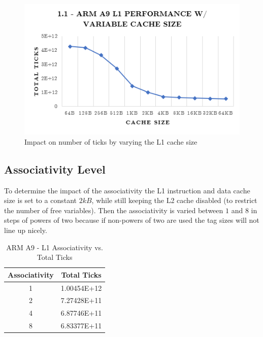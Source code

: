 \documentclass[a4paper, 10pt, conference]{ieeeconf}      %
\begin{document}
\begin{figure}[thpb]
\centering
\includegraphics[scale=.5]{ex1_1.png}
\caption{Impact on number of ticks by varying the L1 cache size}
\label{fig:ex1_1}
\end{figure}

\subsection{Associativity Level}

To determine the impact of the associativity the L1 instruction and data cache size is set to a constant $2kB$, while still keeping the L2 cache disabled (to restrict the number of free variables). Then the associativity is varied between $1$ and $8$ in steps of powers of two because if non-powers of two are used the tag sizes will not line up nicely. 

\begin{table}[h]
\caption{ARM A9 - L1 Associativity vs. Total Ticks}
\label{table_example}
\begin{center}
\begin{tabular}{|c||c|}
\hline
Associativity & Total Ticks\\
\hline
1 & 1.00454E+12\\
\hline
2 & 7.27428E+11\\
\hline
4 & 6.87746E+11\\
\hline
8 & 6.83377E+11
\\
\hline
\end{tabular}
\end{center}
\end{table}
\end{document}

